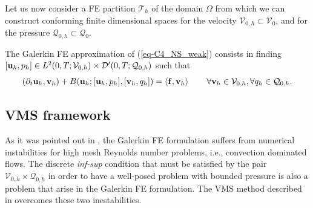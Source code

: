 Let us now consider a FE partition $\mathcal{T}_h$ of the domain $\Omega$ from which we can construct conforming finite dimensional spaces for the velocity $\mathcal{V}_{0,h} \subset \mathcal{V}_0$, and for the pressure $\mathcal{Q}_{0,h}\subset \mathcal{Q}_0$. 

The Galerkin FE approximation of (\ref{eq-C4_NS_weak}) consists in finding $[{\bf u}_h,p_h]\in {L}^2(0,T;\mathcal{V}_{0,h})\times {\cal D}'(0,T;\mathcal{Q}_{0,h})$ such that
\begin{equation}
\label{eq-C4_NS_galerkin}
(\partial_t{\bf u}_h,{\bf v}_h) + B({\bf u}_h;[{\bf u}_h,p_h],[{\bf v}_h,q_h]) =\left<{\bf f},{\bf v}_h\right>
\quad\quad\forall{\bf v}_h\in\mathcal{V}_{0,h},\forall q_h\in\mathcal{Q}_{0,h}.
\end{equation}

\subsection{VMS framework}
\label{subsec-C4_VMS_framework}
As it was pointed out in , the Galerkin FE formulation  suffers from numerical instabilities for high mesh Reynolds number problems, i.e., convection dominated flows. The discrete \textit{inf-sup} condition that must be satisfied by the pair $\mathcal{V}_{0,h} \times\mathcal{Q}_{0,h}$ in order to have a well-posed problem with bounded pressure is also a problem that arise in the Galerkin FE formulation. The VMS method described in  overcomes these two inestabilities.

